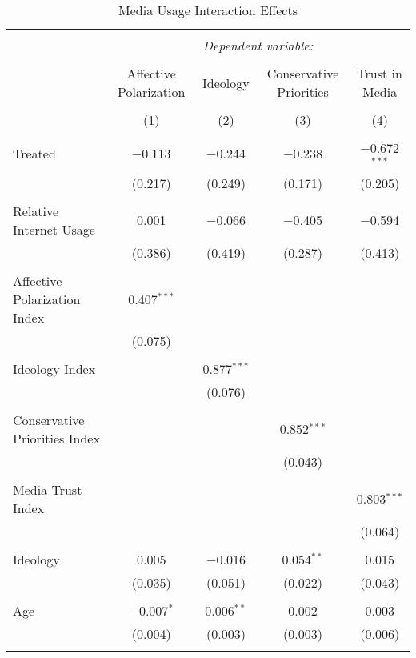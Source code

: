 
\begin{table}[!htbp] \centering 
  \caption{Media Usage Interaction Effects} 
  \label{} 
\tiny 
\begin{tabular}{@{\extracolsep{5pt}}lcccc} 
\\[-1.8ex]\hline 
\hline \\[-1.8ex] 
 & \multicolumn{4}{c}{\textit{Dependent variable:}} \\ 
\cline{2-5} 
\\[-1.8ex] & Affective Polarization & Ideology & Conservative Priorities & Trust in Media \\ 
\\[-1.8ex] & (1) & (2) & (3) & (4)\\ 
\hline \\[-1.8ex] 
 Treated & $-$0.113 & $-$0.244 & $-$0.238 & $-$0.672$^{***}$ \\ 
  & (0.217) & (0.249) & (0.171) & (0.205) \\ 
  & & & & \\ 
 Relative Internet Usage & 0.001 & $-$0.066 & $-$0.405 & $-$0.594 \\ 
  & (0.386) & (0.419) & (0.287) & (0.413) \\ 
  & & & & \\ 
 Affective Polarization Index & 0.407$^{***}$ &  &  &  \\ 
  & (0.075) &  &  &  \\ 
  & & & & \\ 
 Ideology Index &  & 0.877$^{***}$ &  &  \\ 
  &  & (0.076) &  &  \\ 
  & & & & \\ 
 Conservative Priorities Index &  &  & 0.852$^{***}$ &  \\ 
  &  &  & (0.043) &  \\ 
  & & & & \\ 
 Media Trust Index &  &  &  & 0.803$^{***}$ \\ 
  &  &  &  & (0.064) \\ 
  & & & & \\ 
 Ideology & 0.005 & $-$0.016 & 0.054$^{**}$ & 0.015 \\ 
  & (0.035) & (0.051) & (0.022) & (0.043) \\ 
  & & & & \\ 
 Age & $-$0.007$^{*}$ & 0.006$^{**}$ & 0.002 & 0.003 \\ 
  & (0.004) & (0.003) & (0.003) & (0.006) \\ 
  & & & & \\ 

\end{tabular}
\end{table}
